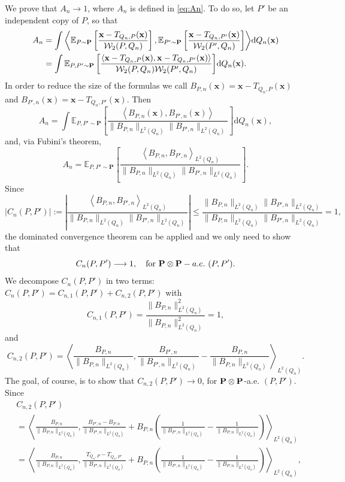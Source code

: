 \documentclass{imsart}
\numberwithin{equation}{section}
\def\E{\mathbb{E}}
\def\x{\mathbf{x}}
\def\E{\mathbb E}
\def\x{\mathbf x}
\begin{document}
We prove that $A_n \to 1$, where $A_n$ is defined in \eqref{eq:An}.
To do so, let $P'$ be an independent copy of $P$, so that 
\begin{align} \label{eq:An:inner:product}
	A_n&=\int{\left\langle\E_{P\sim \mathbf{P}}\left[  \frac{\x-T_{Q_{n} ,P}(\x) }{\mathcal{W}_2(P,Q_{n})}\right], \E_{P'\sim \mathbf{P}}\left[  \frac{\x-T_{Q_{n} ,P'}(\x) }{\mathcal{W}_2(P',Q_{n})}\right] \right\rangle} \mathrm{d}Q_{n} (\x) \notag \\
	& =\int{\E_{P, P'\sim \mathbf{P}}\left[  \frac{ \left\langle\x-T_{Q_{n} ,P}(\x), \x-T_{Q_{n} ,P'}(\x)  \right\rangle}{\mathcal{W}_2(P,Q_{n}) \mathcal{W}_2(P',Q_{n})}\right] } \mathrm{d}Q_{n} (\x).
\end{align}
In order to reduce the size of the formulas we call 
$ B_{P,n}(\x)=\x-T_{Q_{n} ,P}(\x)$ and $ B_{P',n}(\x)=\x-T_{Q_{n} ,P'}(\x)$. Then 
$$  A_n=\int{\E_{P, P'\sim \mathbf{P}}\left[  \frac{ \left\langle B_{P,n}(\x), B_{P',n}(\x)  \right\rangle}{\|B_{P,n}\|_{L^2(Q_n)} \|B_{P',n}\|_{L^2(Q_n)}}\right] } \mathrm{d}Q_{n} (\x),$$
and, via Fubini's theorem, 
$$  A_n=\E_{P, P'\sim \mathbf{P}}\left[  \frac{ \left\langle B_{P,n}, B_{P',n} \right\rangle_{L^2(Q_n)}}{\|B_{P,n}\|_{L^2(Q_n)} \|B_{P',n}\|_{L^2(Q_n)}}\right].$$
Since 
\begin{equation*}
	\left|   C_n(P,P') \right|
	:=
	\left|
	\frac{ \left\langle B_{P,n}, B_{P',n} \right\rangle_{L^2(Q_n)}}{\|B_{P,n}\|_{L^2(Q_n)} \|B_{P',n}\|_{L^2(Q_n)}}
	\right|
	\leq \frac{ \| B_{P,n}\|_{L^2(Q_n)}\| B_{P',n} \|_{L^2(Q_n)}}{\|B_{P,n}\|_{L^2(Q_n)} \|B_{P',n}\|_{L^2(Q_n)}} = 1,
\end{equation*}
the dominated convergence theorem can be applied and we only need to show that 
\begin{equation}
	\label{eq:Cn}
	C_n(P,P') \longrightarrow   1,\quad \text{for } {\bf P }\otimes {\bf P}-{\rm a.e.}\  (P,P').
\end{equation}
We decompose $C_n(P,P')$ in two terms: $C_n(P,P')=C_{n,1}(P,P')+C_{n,2}(P,P')$ with
$$ C_{n,1}(P,P')= \frac{ \|B_{P,n}\|_{L^2(Q_n)}^2} {\|B_{P,n}\|_{L^2(Q_n)}^2}=1 , $$
and
$$ C_{n,2}(P,P')=  \left\langle \frac{  B_{P,n}}{\|B_{P,n}\|_{L^2(Q_n)}},  \frac{  B_{P',n}}{\|B_{P',n}\|_{L^2(Q_n)}} -\frac{  B_{P,n}}{\|B_{P,n}\|_{L^2(Q_n)}}  \right\rangle_{L^2(Q_n)}  . $$
The goal, of course, is to show that $C_{n,2}(P,P')\to 0$, for ${\bf P }\otimes {\bf P}$-a.e. $(P,P')$.  Since 
\begin{align*}
	&C_{n,2}(P,P')\\
	&= \left\langle \frac{  B_{P,n}}{\|B_{P,n}\|_{L^2(Q_n)}},  \frac{  B_{P',n}-B_{P,n}}{\|B_{P',n}\|_{L^2(Q_n)}} +  B_{P,n}\left(\frac{1}{\|B_{P',n}\|_{L^2(Q_n)}}-\frac{1}{\|B_{P,n}\|_{L^2(Q_n)}}  \right)\right\rangle_{L^2(Q_n)} \\
	&=  \left\langle \frac{  B_{P,n}}{\|B_{P,n}\|_{L^2(Q_n)}},  \frac{  T_{Q_n,P}-T_{Q_n, P'}}{\|B_{P',n}\|_{L^2(Q_n)}} +  B_{P,n}\left(\frac{1}{\|B_{P',n}\|_{L^2(Q_n)}}-\frac{1}{\|B_{P,n}\|_{L^2(Q_n)}}  \right)\right\rangle_{L^2(Q_n)} ,
\end{align*}
\end{document}
